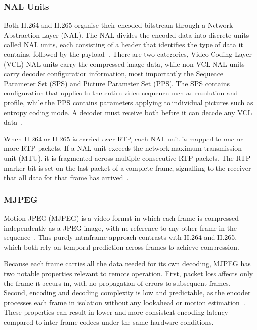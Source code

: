 \subsubsection{NAL Units}\label{subsubsec:nal}
 
Both H.264 and H.265 organise their encoded bitstream through a Network Abstraction Layer (NAL). The NAL divides the encoded data into discrete units called NAL units, each consisting of a header that identifies the type of data it contains, followed by the payload~\cite{wiegand2003}. There are two categories, Video Coding Layer (VCL) NAL units carry the compressed image data, while non-VCL NAL units carry decoder configuration information, most importantly the Sequence Parameter Set (SPS) and Picture Parameter Set (PPS). The SPS contains configuration that applies to the entire video sequence such as resolution and profile, while the PPS contains parameters applying to individual pictures such as entropy coding mode. A decoder must receive both before it can decode any VCL data~\cite{vocal_nal}.
 
When H.264 or H.265 is carried over RTP, each NAL unit is mapped to one or more RTP packets. If a NAL unit exceeds the network maximum transmission unit (MTU), it is fragmented across multiple consecutive RTP packets. The RTP marker bit is set on the last packet of a complete frame, signalling to the receiver that all data for that frame has arrived~\cite{rfc6184}.

\subsubsection{MJPEG}\label{subsubsec:mjpeg}
Motion JPEG (MJPEG) is a video format in which each frame is compressed independently as a JPEG image, with no reference to any other frame in the sequence~\cite{wikipedia_mjpeg}. This purely intraframe approach contrasts with H.264 and H.265, which both rely on temporal prediction across frames to achieve compression.
 
Because each frame carries all the data needed for its own decoding, MJPEG has two notable properties relevant to remote operation. First, packet loss affects only the frame it occurs in, with no propagation of errors to subsequent frames. Second, encoding and decoding complexity is low and predictable, as the encoder processes each frame in isolation without any lookahead or motion estimation~\cite{econ2024}. These properties can result in lower and more consistent encoding latency compared to inter-frame codecs under the same hardware conditions.
 
